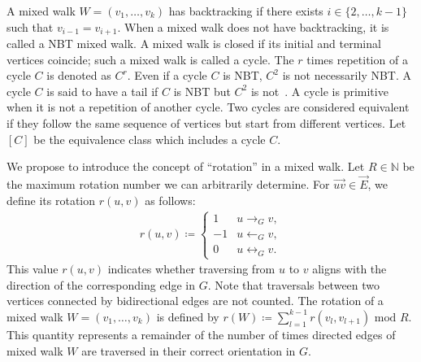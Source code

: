 \documentclass{article}
\theoremstyle{plain}
\begin{document}
A mixed walk $W=(v_1, \dots, v_k)$ has backtracking if there exists $i\in \{ 2,\dots, k-1 \}$ such that $v_{i-1} = v_{i+1}$.
When a mixed walk does not have backtracking, it is called a NBT mixed walk.
A mixed walk is closed if its initial and terminal vertices coincide; such a mixed walk is called a cycle.
The $r$ times repetition of a cycle $C$ is denoted as $C^r$.
Even if a cycle $C$ is NBT, $C^2$ is not necessarily NBT.
A cycle $C$ is said to have a tail if $C$ is NBT but $C^2$ is not~\citep{Stark1996-mx}.
A cycle is primitive when it is not a repetition of another cycle.
Two cycles are considered equivalent if they follow the same sequence of vertices but start from different vertices.
Let $[C]$ be the equivalence class which includes a cycle $C$.

We propose to introduce the concept of ``rotation'' in a mixed walk.
Let $R \in \mathbb{N}$ be the maximum rotation number we can arbitrarily determine.
For $\overrightarrow{uv} \in \vec{E}$, we define its rotation $r(u,v)$ as follows:
\begin{align*}
	r(u,v) \coloneqq \begin{cases}
		                 1  & u \rightarrow_{G} v
		                 ,                            \\
		                 -1 & u\leftarrow_{G} v
		                 ,                            \\
		                 0  & u \leftrightarrow_{G} v
		                 .
	                 \end{cases}
\end{align*}
This value $r(u,v)$ indicates whether traversing from $u$ to $v$ aligns with the direction of the corresponding edge in $G$. Note that traversals between two vertices connected by bidirectional edges are not counted.
The rotation of a mixed walk $W=(v_1,\dots, v_k)$ is defined by $r(W) \coloneqq \sum_{l=1}^{k-1} r(v_l, v_{l+1}) \text{ mod } R$.
This quantity represents a remainder of the number of times directed edges of mixed walk $W$ are traversed in their correct orientation in $G$.
\end{document}
